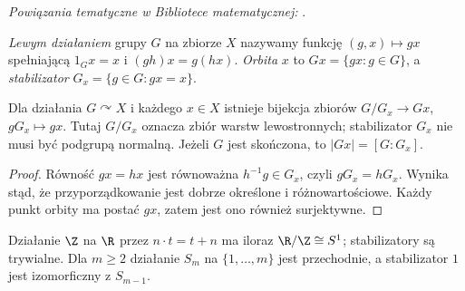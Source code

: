 \noindent\emph{Powiązania tematyczne w Bibliotece matematycznej:} .

\begin{definicja}
\emph{Lewym działaniem} grupy $G$ na zbiorze $X$ nazywamy funkcję
$(g,x)\mapsto gx$ spełniającą $1_Gx=x$ i $(gh)x=g(hx)$.
\emph{Orbita} $x$ to $Gx=\{gx:g\in G\}$, a \emph{stabilizator}
$G_x=\{g\in G:gx=x\}$.
\end{definicja}
\begin{twierdzenie}
Dla działania $G\curvearrowright X$ i każdego $x\in X$ istnieje
bijekcja zbiorów $G/G_x\to Gx$, $gG_x\mapsto gx$.
Tutaj $G/G_x$ oznacza zbiór warstw lewostronnych; stabilizator
$G_x$ nie musi być podgrupą normalną.
Jeżeli $G$ jest skończona, to $|Gx|=[G:G_x]$.
\end{twierdzenie}
\begin{proof}
Równość $gx=hx$ jest równoważna $h^{-1}g\in G_x$,
czyli $gG_x=hG_x$. Wynika stąd, że przyporządkowanie jest dobrze określone
i różnowartościowe. Każdy punkt orbity ma postać $gx$,
zatem jest ono również surjektywne.
\end{proof}
\begin{przyklad}
Działanie $\Z$ na $\R$ przez $n\cdot t=t+n$ ma iloraz
$\R/\Z\cong S^1$; stabilizatory są trywialne.
Dla $m\geq2$ działanie $S_m$ na $\{1,\ldots,m\}$
jest przechodnie, a stabilizator $1$ jest izomorficzny
z $S_{m-1}$.
\end{przyklad}

